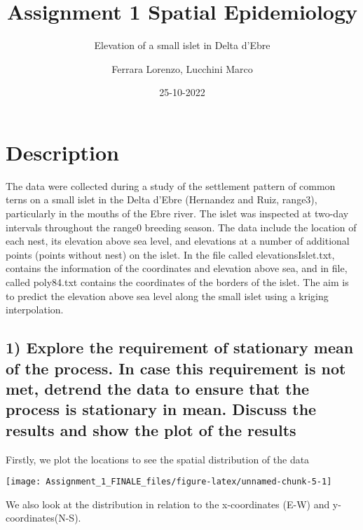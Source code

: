 \documentclass[
]{article}
\title{Assignment 1 Spatial Epidemiology}
\subtitle{Elevation of a small islet in Delta d'Ebre}
\author{Ferrara Lorenzo, Lucchini Marco}
\date{25-10-2022}
\begin{document}
\maketitle

\hypertarget{description}{%
\section{Description}\label{description}}

The data were collected during a study of the settlement pattern of
common terns on a small islet in the Delta d'Ebre (Hernandez and Ruiz,
range3), particularly in the mouths of the Ebre river. The islet was
inspected at two-day intervals throughout the range0 breeding season.
The data include the location of each nest, its elevation above sea
level, and elevations at a number of additional points (points without
nest) on the islet. In the file called elevationsIslet.txt, contains the
information of the coordinates and elevation above sea, and in file,
called poly84.txt contains the coordinates of the borders of the islet.
The aim is to predict the elevation above sea level along the small
islet using a kriging interpolation.

\hypertarget{explore-the-requirement-of-stationary-mean-of-the-process.-in-case-this-requirement-is-not-met-detrend-the-data-to-ensure-that-the-process-is-stationary-in-mean.-discuss-the-results-and-show-the-plot-of-the-results}{%
\subsection{1) Explore the requirement of stationary mean of the
process. In case this requirement is not met, detrend the data to ensure
that the process is stationary in mean. Discuss the results and show the
plot of the
results}\label{explore-the-requirement-of-stationary-mean-of-the-process.-in-case-this-requirement-is-not-met-detrend-the-data-to-ensure-that-the-process-is-stationary-in-mean.-discuss-the-results-and-show-the-plot-of-the-results}}

Firstly, we plot the locations to see the spatial distribution of the
data

\begin{center}\texttt{[image: Assignment\_1\_FINALE\_files/figure-latex/unnamed-chunk-5-1]} \end{center}

We also look at the distribution in relation to the x-coordinates (E-W)
and y-coordinates(N-S).
\end{document}
